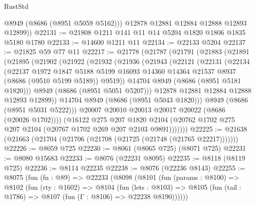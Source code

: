 \begin{lexlean}{RustStd}
\begin{coremodule}
          @8949
          (@8686 (@8951 @5059 @5162)))
        @12878
        @12881
        @12884
        @12888
        @12893
        @12899))
@22131 := @21808 @1211 @141 @11 @14 @5204 @1820 @1806 @1835 @5180 @1780
@22133 := @14600 @1211 @11
@22134 := @22133 @5204
@22137 := @21825 @59 @77 @11
@22217 := @21778
    (@21787
      (@21791
        (@21883
          (@21891
            (@21895
              (@21902
                (@21922
                  (@21932
                    (@21936
                      (@21943
                        (@22121
                          (@22131
                            (@22134
                              (@22137
                                @1972
                                @1847
                                @5188
                                @5199
                                @16093
                                @14360
                                @14364
                                @21537
                                @8937
                                (@8686 (@9510 @5199 @5189))
                                @9519))
                            @14704
                            @8949
                            (@8686 (@8951 @5181 @1820)))
                          @8949
                          (@8686 (@8951 @5051 @5207)))
                        @12878
                        @12881
                        @12884
                        @12888
                        @12893
                        @12899))
                    @14704
                    @8949
                    (@8686 (@8951 @5043 @1820)))
                  @8949
                  (@8686 (@8951 @5031 @5222)))
                @20007
                @20010
                @20013
                @20017
                @20022
                (@8686 (@20026 @1702))))
            (@16122
              @275
              @207
              @1820
              @2104
              (@20762 @1702 @275 @207 @2104 (@20767 @1702 @269 @207 @2103 @9891)))))))
@22225 := @21638 (@21663 (@21704 (@21706 (@21708 (@21725 (@21748 (@21765 @22217)))))))
@22226 := @8059 @725
@22230 := @8061 (@8065 @725) (@8071 @725)
@22231 := @8080 @15683
@22233 := @8076 (@22231 @8095)
@22235 := @8118 (@8119 @725)
@22236 := @8114 @22235
@22238 := @8076 (@22236 @8143)
@22255 := @8075
    (fun (fn : @89) =>
    @22233
      (@8098
        (@8101
          (fun (params : @8100) =>
          @8102
            (fun (rty : @1602) =>
            @8104
              (fun (lets : @8103) =>
              @8105 (fun (tail : @1786) => @8107 (fun (Γ : @8106) => @22238 @8190))))))

\end{coremodule}
\end{lexlean}
